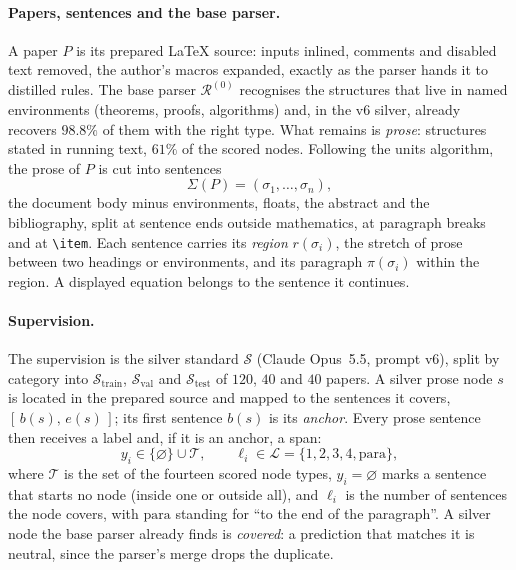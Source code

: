 \documentclass[10pt]{article}
\newcommand{\none}{\varnothing}
\begin{document}
\paragraph{Papers, sentences and the base parser.}
A paper $P$ is its prepared \LaTeX{} source: inputs inlined, comments and disabled text removed, the author's macros expanded, exactly as the parser hands it to distilled rules. The base parser $\mathcal{R}^{(0)}$ recognises the structures that live in named environments (theorems, proofs, algorithms) and, in the v6 silver, already recovers $98.8\%$ of them with the right type. What remains is \emph{prose}: structures stated in running text, $61\%$ of the scored nodes. Following the units algorithm, the prose of $P$ is cut into sentences
%
\begin{equation}
  \Sigma(P) = (\sigma_1,\dots,\sigma_n),
\end{equation}
%
the document body minus environments, floats, the abstract and the bibliography, split at sentence ends outside mathematics, at paragraph breaks and at \verb|\item|. Each sentence carries its \emph{region} $r(\sigma_i)$, the stretch of prose between two headings or environments, and its paragraph $\pi(\sigma_i)$ within the region. A displayed equation belongs to the sentence it continues.

\paragraph{Supervision.}
The supervision is the silver standard $\mathcal{S}$ (Claude Opus~5.5, prompt v6), split by category into $\mathcal{S}_{\mathrm{train}}$, $\mathcal{S}_{\mathrm{val}}$ and $\mathcal{S}_{\mathrm{test}}$ of $120$, $40$ and $40$ papers. A silver prose node $s$ is located in the prepared source and mapped to the sentences it covers, $[\,b(s),\,e(s)\,]$; its first sentence $b(s)$ is its \emph{anchor}. Every prose sentence then receives a label and, if it is an anchor, a span:
%
\begin{equation}
  y_i \in \{\none\}\cup\mathcal{T},
  \qquad
  \ell_i \in \mathcal{L}=\{1,2,3,4,\mathrm{para}\},
  \label{eq:labels}
\end{equation}
%
where $\mathcal{T}$ is the set of the fourteen scored node types, $y_i=\none$ marks a sentence that starts no node (inside one or outside all), and $\ell_i$ is the number of sentences the node covers, with $\mathrm{para}$ standing for ``to the end of the paragraph''. A silver node the base parser already finds is \emph{covered}: a prediction that matches it is neutral, since the parser's merge drops the duplicate.
\end{document}
